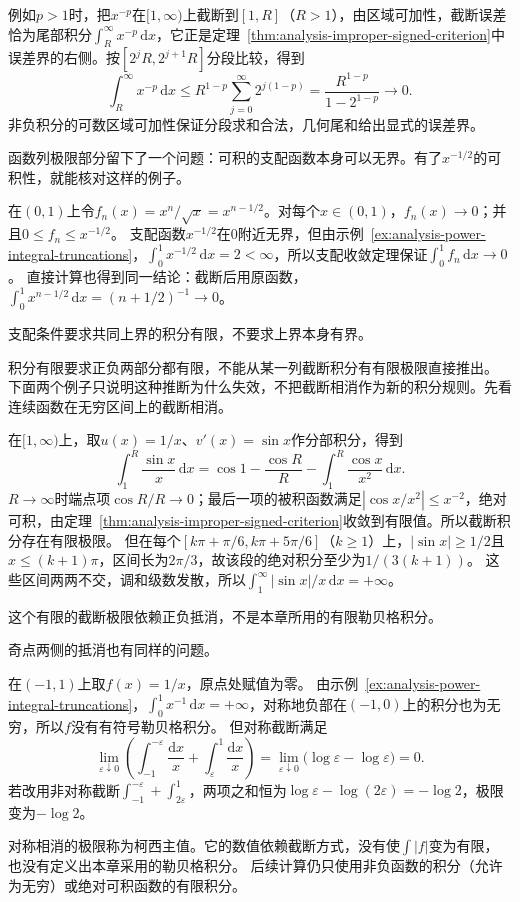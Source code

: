 例如$p>1$时，把$x^{-p}$在$[1,\infty)$上截断到$[1,R]$（$R>1$），由区域可加性，截断误差恰为尾部积分$\int_R^\infty x^{-p}\,\mathrm dx$，它正是定理~\ref{thm:analysis-improper-signed-criterion}中误差界的右侧。按$[2^jR,2^{j+1}R]$分段比较，得到
\[
 \int_R^\infty x^{-p}\,\mathrm dx
 \leq R^{1-p}\sum_{j=0}^\infty2^{j(1-p)}
 =\frac{R^{1-p}}{1-2^{1-p}}\longrightarrow0.
\]
非负积分的可数区域可加性保证分段求和合法，几何尾和给出显式的误差界。

函数列极限部分留下了一个问题：可积的支配函数本身可以无界。有了$x^{-1/2}$的可积性，就能核对这样的例子。
\begin{example}[无界的可积支配函数]
\label{ex:analysis-unbounded-dominating}
在$(0,1)$上令$f_n(x)=x^n/\sqrt x=x^{n-1/2}$。对每个$x\in(0,1)$，$f_n(x)\to0$；并且$0\leq f_n\leq x^{-1/2}$。
支配函数$x^{-1/2}$在$0$附近无界，但由示例~\ref{ex:analysis-power-integral-truncations}，$\int_0^1x^{-1/2}\,\mathrm dx=2<\infty$，所以支配收敛定理保证$\int_0^1f_n\,\mathrm dx\to0$。
直接计算也得到同一结论：截断后用原函数，$\int_0^1x^{n-1/2}\,\mathrm dx=(n+1/2)^{-1}\to0$。
\end{example}
支配条件要求共同上界的积分有限，不要求上界本身有界。

积分有限要求正负两部分都有限，不能从某一列截断积分有有限极限直接推出。
下面两个例子只说明这种推断为什么失效，不把截断相消作为新的积分规则。先看连续函数在无穷区间上的截断相消。
\begin{example}
\label{ex:analysis-sine-over-x}
在$[1,\infty)$上，取$u(x)=1/x$、$v'(x)=\sin x$作分部积分，得到
\[
 \int_1^R\frac{\sin x}{x}\,\mathrm dx
 =\cos1-\frac{\cos R}{R}-\int_1^R\frac{\cos x}{x^2}\,\mathrm dx.
\]
$R\to\infty$时端点项$\cos R/R\to0$；最后一项的被积函数满足$|\cos x/x^2|\leq x^{-2}$，绝对可积，由定理~\ref{thm:analysis-improper-signed-criterion}收敛到有限值。所以截断积分存在有限极限。
但在每个$[k\pi+\pi/6,k\pi+5\pi/6]$（$k\geq1$）上，$|\sin x|\geq1/2$且$x\leq(k+1)\pi$，区间长为$2\pi/3$，故该段的绝对积分至少为$1/(3(k+1))$。
这些区间两两不交，调和级数发散，所以$\int_1^\infty|\sin x|/x\,\mathrm dx=+\infty$。
\end{example}
这个有限的截断极限依赖正负抵消，不是本章所用的有限勒贝格积分。

奇点两侧的抵消也有同样的问题。
\begin{example}[$1/x$的柯西主值]
\label{ex:analysis-cauchy-principal-value}
在$(-1,1)$上取$f(x)=1/x$，原点处赋值为零。
由示例~\ref{ex:analysis-power-integral-truncations}，$\int_0^1x^{-1}\,\mathrm dx=+\infty$，对称地负部在$(-1,0)$上的积分也为无穷，所以$f$没有有符号勒贝格积分。
但对称截断满足
\[
 \lim_{\varepsilon\downarrow0}\left(
 \int_{-1}^{-\varepsilon}\frac{\mathrm dx}{x}
 +\int_{\varepsilon}^{1}\frac{\mathrm dx}{x}\right)
 =\lim_{\varepsilon\downarrow0}\bigl(\log\varepsilon-\log\varepsilon\bigr)=0.
\]
若改用非对称截断$\int_{-1}^{-\varepsilon}+\int_{2\varepsilon}^1$，两项之和恒为$\log\varepsilon-\log(2\varepsilon)=-\log2$，极限变为$-\log2$。
\end{example}
对称相消的极限称为柯西主值。它的数值依赖截断方式，没有使$\int|f|$变为有限，也没有定义出本章采用的勒贝格积分。
后续计算仍只使用非负函数的积分（允许为无穷）或绝对可积函数的有限积分。

\FloatBarrier
